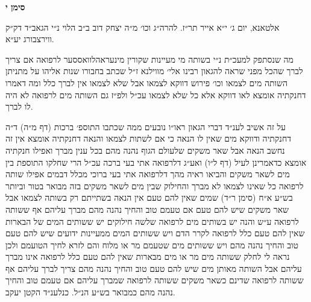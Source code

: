 \documentclass[12pt, openany]{book}
\newcommand{\chapname}{}
\newcommand{\newchap}[1]{
	\addcontentsline{toc}{chapter}{#1}
	\renewcommand{\chapname}{#1}
		\begin{center}
			\textbf{%
\fontsize{16pt}{16pt}\selectfont
				#1}
		\end{center}
}
\begin{document}
\newchap{סימן י}
\begin{multicols}{2}
אלטאנא, יום ג׳ י״א אייר תר״ז. להרה״ג וכו׳ מ״ה יצחק דוב ב״ב הלוי נ״י הגאב״ד דק״ק ווירצבורג יע״א.\\\vspace{0pt}

מה שנסתפק למעכ״ת נ״י בשותה מי מעיינות שקורין מינעראהלוואססער לרפואה אם צריך לברך שהכל מפני שראה להגאון רבינו אלי׳ מווילנא ז״ל שכתב בחבורו שנות אליהו על מתניתן השותה מים לצמאו וכו׳ פירוש דווקא לצמאו אבל שלא לצמאו אין לברך כלל ומה דאמרו דחנקתיה אומצא לאו דווקא אלא כל שלא לצמאו עכ״ל ולפ״ז גם השותה מים לרפואה לא היה לו לברך.\\\vspace{0pt}

על זה אשיב לענ״ד דברי הגאון ראו״ו נובעים ממה שכתבו התוספ׳ ברכות (דף מ״ה) ד״ה דחנקתיה ודווקא מים שאין לו הנאה כי אם לשתות לצמאו והנאה דחנקתיה אומצא אין זה נחשב הנאה אבל שאר משקים שלעולם הגוף נהנה מהם בכל ענין מברך ואפילו חנקתיה אומצא כדאמרינן לעיל (דף ל״ו) ואע״ג דלרפואה אתי בעי ברכה עכ״ל הרי שחלקו התוספת בין מים לשאר משקים והביאו ראיה מהך דלרפואה אתי בעי ברוכי מכלל דבמים אפילו שותה לרפואה כל שאינו לצמאו לא מברך והחילוק שבין מים לשאר משקים בזה מבואר בטור וביותר בש״ע א״ח (סימן ר״ד) שמים שאין להם טעם אין הנאה בשתייתם רק בשותה לצמאו אבל שאר משקים שיש להם טעם אם טעמם טוב והחיך נהנה מהם מברך עליהם אף ששותה לרפואה ע״ש והנה יש בשותים מים לרפואה שלשה חילוקים יש ששותים המים של הבארות שאין להם טעם כלל לרפואה לקרר הדם ויש ששותים המים ממעיינות ידועים שיש להם טעם טוב והחיך נהנה מהם ויש ששותים מים שטעמם מר או מלוח והם לזרא לחיך הטועמם ולכן נראה לי לחלק ששותה מים מר או מים מבארות שאין להם טעם כלל לרפואה אינו מברך עליהם אבל השותה מאותן מים שיש להם טעם טוב והחיך נהנה מהם צריך לברך עליהם אף ששותה לרפואה שדינם כשאר משקים ששותה לרפואה שמברך עליהם אם טעמם טוב והחיך נהנה מהם כמבואר בש״ע הנ״ל. כנלענ״ד הקטן יעקב.\\\vspace{0pt}

\end{multicols}\newpage
\end{document}

